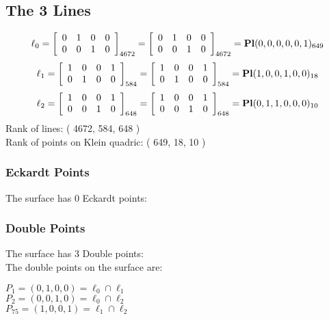 \documentclass{article}
\begin{document}
{\subsection*{The 3 Lines}
$$
\ell_{0} = 
\left[
\begin{array}{*{4}{r}}
0 & 1 & 0 & 0\\
0 & 0 & 1 & 0\\
\end{array}
\right]
_{4672}
=
\left[
\begin{array}{*{4}c}
0  & 1  & 0  & 0\\
0  & 0  & 1  & 0\\
\end{array}
\right]_{4672}
={\rm\bf Pl}(0,0,0,0,0,1 )_{649}$$
$$
\ell_{1} = 
\left[
\begin{array}{*{4}{r}}
1 & 0 & 0 & 1\\
0 & 1 & 0 & 0\\
\end{array}
\right]
_{584}
=
\left[
\begin{array}{*{4}c}
1  & 0  & 0  & 1\\
0  & 1  & 0  & 0\\
\end{array}
\right]_{584}
={\rm\bf Pl}(1,0,0,1,0,0 )_{18}$$
$$
\ell_{2} = 
\left[
\begin{array}{*{4}{r}}
1 & 0 & 0 & 1\\
0 & 0 & 1 & 0\\
\end{array}
\right]
_{648}
=
\left[
\begin{array}{*{4}c}
1  & 0  & 0  & 1\\
0  & 0  & 1  & 0\\
\end{array}
\right]_{648}
={\rm\bf Pl}(0,1,1,0,0,0 )_{10}$$
Rank of lines: ( 4672, 584, 648 )\\
Rank of points on Klein quadric: ( 649, 18, 10 )\\
\subsubsection*{Eckardt Points}
The surface has 0 Eckardt points:\\
\subsubsection*{Double Points}
The surface has 3 Double points:\\
The double points on the surface are:\\
\begin{multicols}{2}
\noindent
$P_{1} = ( 0, 1, 0, 0 ) = \ell_{0} \cap \ell_{1} $\\
$P_{2} = ( 0, 0, 1, 0 ) = \ell_{0} \cap \ell_{2} $\\
$P_{75} = ( 1, 0, 0, 1 ) = \ell_{1} \cap \ell_{2} $\\
\end{multicols}
}
\end{document}
